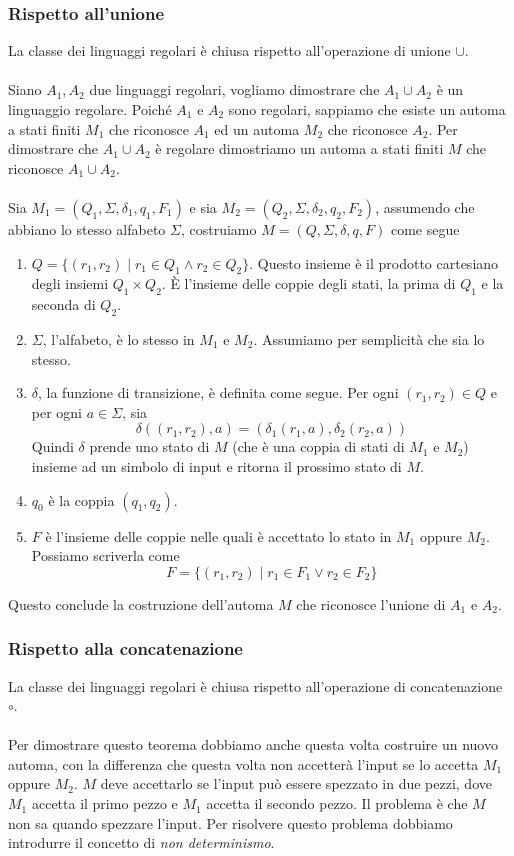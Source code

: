 \documentclass[italian]{article}
\newcommand{\taleche}{\;|\;}
\begin{document}
\subsubsection{Rispetto all'unione}
La classe dei linguaggi regolari è chiusa rispetto all'operazione di unione $\cup$.\\\\
Siano $A_1,A_2$ due linguaggi regolari, vogliamo dimostrare che $A_1 \cup A_2$ è un linguaggio regolare. Poiché $A_1$ e $A_2$ sono regolari, sappiamo che esiste un automa a stati finiti $M_1$ che riconosce $A_1$ ed un automa $M_2$ che riconosce $A_2$. Per dimostrare che $A_1 \cup A_2$ è regolare dimostriamo un automa a stati finiti $M$ che riconosce $A_1 \cup A_2$. \\\\
Sia $M_1 = (Q_1,\Sigma,\delta_1,q_1,F_1)$ e sia $M_2 = (Q_2,\Sigma,\delta_2,q_2,F_2)$, assumendo che abbiano lo stesso alfabeto $\Sigma$, costruiamo $M = (Q,\Sigma,\delta,q,F)$ come segue
\begin{enumerate}
	\item $Q = \{ (r_1,r_2) \taleche r_1 \in Q_1 \land r_2 \in Q_2 \}$. Questo insieme è il prodotto cartesiano degli insiemi $Q_1\times Q_2$. È l'insieme delle coppie degli stati, la prima di $Q_1$ e la seconda di $Q_2$.
	\item $\Sigma$, l'alfabeto, è lo stesso in $M_1$ e $M_2$. Assumiamo per semplicità che sia lo stesso.
	\item $\delta$, la funzione di transizione, è definita come segue. Per ogni $(r_1,r_2) \in Q$ e per ogni $a \in \Sigma$, sia
	\[
		\delta\left( (r_1,r_2),a \right) = \left( \delta_1(r_1,a),\delta_2(r_2,a) \right)
	\]
	Quindi $\delta$ prende uno stato di $M$ (che è una coppia di stati di $M_1$ e $M_2$) insieme ad un simbolo di input e ritorna il prossimo stato di $M$.
	\item $q_0$ è la coppia $(q_1,q_2)$.
	\item $F$ è l'insieme delle coppie nelle quali è accettato lo stato in $M_1$ oppure $M_2$. Possiamo scriverla come
	\[
		F = \{ (r_1,r_2) \taleche r_1 \in F_1 \lor r_2 \in F_2 \}
	\]
\end{enumerate}
Questo conclude la costruzione dell'automa $M$ che riconosce l'unione di $A_1$ e $A_2$.
\subsubsection{Rispetto alla concatenazione}
La classe dei linguaggi regolari è chiusa rispetto all'operazione di concatenazione $\circ$.\\\\
Per dimostrare questo teorema dobbiamo anche questa volta costruire un nuovo automa, con la differenza che questa volta non accetterà l'input se lo accetta $M_1$ oppure $M_2$. $M$ deve accettarlo se l'input può essere spezzato in due pezzi, dove $M_1$ accetta il primo pezzo e $M_1$ accetta il secondo pezzo. Il problema è che $M$ non sa quando spezzare l'input. Per risolvere questo problema dobbiamo introdurre il concetto di \textit{non determinismo}.
\end{document}
